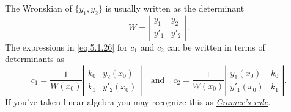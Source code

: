 \documentclass{ximera}
\begin{document}
The Wronskian of  $\{y_1,y_2\}$ is usually written as the determinant
$$
W=\left| \begin{array}{cc}
y_1 & y_2 \\
y'_1 & y'_2
\end{array} \right|.
$$
 The expressions in \eqref{eq:5.1.26} for $c_1$ and $c_2$ can
be written in terms of determinants as
$$
c_1=\frac{1}{W(x_0)}
\left| \begin{array}{cc}
k_0 & y_2(x_0) \\
k_1 & y'_2(x_0)
\end{array} \right|
\quad\mbox{and}\quad
c_2=\frac{1}{W(x_0)}
\left| \begin{array}{cc}
y_1(x_0) & k_0 \\
y'_1(x_0) &k_1
\end{array} \right|.
$$
If you've taken linear algebra you may recognize this as
\href{http://www-history.mcs.st-and.ac.uk/Mathematicians/Cramer.html}
{\color{blue}\it Cramer's rule}.
\end{document}
